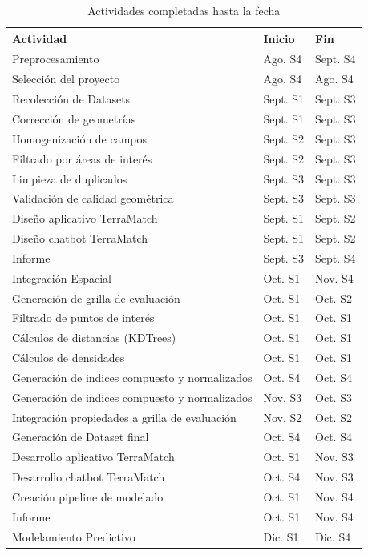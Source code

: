 \documentclass[11pt,letterpaper]{article}
\begin{document}
\begin{table}[H]
\centering
\caption{Actividades completadas hasta la fecha}
\begin{tabular}{@{}lll@{}}
\toprule
\textbf{Actividad} & \textbf{Inicio} & \textbf{Fin} \\
\midrule
Preprocesamiento & Ago. S4 & Sept. S4 \\
\midrule
Selección del proyecto & Ago. S4 & Ago. S4 \\
Recolección de Datasets & Sept. S1 & Sept. S3 \\
Corrección de geometrías & Sept. S1 & Sept. S3 \\
Homogenización de campos & Sept. S2 & Sept. S3 \\
Filtrado por áreas de interés & Sept. S2 & Sept. S3 \\
Limpieza de duplicados & Sept. S3 & Sept. S3 \\
Validación de calidad geométrica & Sept. S3 & Sept. S3 \\
Diseño aplicativo TerraMatch & Sept. S1 & Sept. S2 \\
Diseño chatbot TerraMatch & Sept. S1 & Sept. S2 \\
Informe & Sept. S3 & Sept. S4 \\
\midrule
Integración Espacial & Oct. S1 & Nov. S4 \\
\midrule
Generación de grilla de evaluación & Oct. S1 & Oct. S2 \\
Filtrado de puntos de interés & Oct. S1 & Oct. S1 \\
Cálculos de distancias (KDTrees) & Oct. S1 & Oct. S1 \\
Cálculos de densidades & Oct. S1 & Oct. S1 \\
Generación de indices compuesto y normalizados & Oct. S4 & Oct. S4 \\
Generación de indices compuesto y normalizados & Nov. S3 & Oct. S3 \\
Integración propiedades a grilla de evaluación & Nov. S2 & Oct. S2 \\
Generación de Dataset final & Oct. S4 & Oct. S4 \\
Desarrollo aplicativo TerraMatch & Oct. S1 & Nov. S3 \\
Desarrollo chatbot TerraMatch & Oct. S4 & Nov. S3 \\
Creación pipeline de modelado & Oct. S1 & Nov. S4 \\
Informe & Oct. S1 & Nov. S4 \\
\midrule
Modelamiento Predictivo & Dic. S1 & Dic. S4 \\

\end{tabular}
\end{table}
\end{document}
